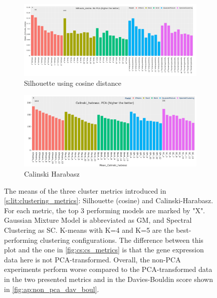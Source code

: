 \begin{figure}[H]
    \centering
    \begin{subfigure}[!t]{1.0\textwidth}
        \includegraphics[width=\textwidth,keepaspectratio]{Sections/ClusteringAnalysis/Resources/cs_top3/non_PCA_top3_Silhoute_cosine.png}
        \caption{Silhouette using cosine distance}
        \label{fig:ap:cosine}
    \end{subfigure}
    \centering
    \begin{subfigure}[!t]{1.0\textwidth}
        \includegraphics[width=\textwidth,keepaspectratio]{Sections/ClusteringAnalysis/Resources/cs_top3/PCA_top3_Calinski_habrasz.png}
        \caption{Calinski Harabasz}
        \label{fig:ap:cal_hab}
    \end{subfigure}
    \caption[Non-PCA transformed data: Silhouette and Calinski-Harabasz]{The means of the three cluster metrics introduced in \cref{s:lit:clustering_metrics}: Silhouette (cosine) and Calinski-Harabasz. For each metric, the top 3 performing models are marked by "X". Gaussian Mixture Model is abbreviated as GM, and Spectral Clustering as SC. K-means with K=4 and K=5 are the best-performing clustering configurations. The difference between this plot and the one in \cref{fig:cs:cs_metrics} is that the gene expression data here is not PCA-transformed. Overall, the non-PCA experiments perform worse compared to the PCA-transformed data in the two presented metrics and in the Davies-Bouldin score shown in \cref{fig:ap:non_pca_dav_boul}.}
    \label{fig:ap:non_pca_metrics}
\end{figure}

